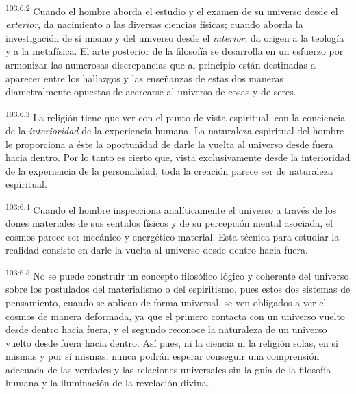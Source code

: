 \par
\textsuperscript{103:6.2} Cuando el hombre aborda el estudio y el examen de su universo desde el \textit{exterior}, da nacimiento a las diversas ciencias físicas; cuando aborda la investigación de sí mismo y del universo desde el \textit{interior}, da origen a la teología y a la metafísica. El arte posterior de la filosofía se desarrolla en un esfuerzo por armonizar las numerosas discrepancias que al principio están destinadas a aparecer entre los hallazgos y las enseñanzas de estas dos maneras diametralmente opuestas de acercarse al universo de cosas y de seres.

\par
\textsuperscript{103:6.3} La religión tiene que ver con el punto de vista espiritual, con la conciencia de la \textit{interioridad} de la experiencia humana. La naturaleza espiritual del hombre le proporciona a éste la oportunidad de darle la vuelta al universo desde fuera hacia dentro. Por lo tanto es cierto que, vista exclusivamente desde la interioridad de la experiencia de la personalidad, toda la creación parece ser de naturaleza espiritual.

\par
\textsuperscript{103:6.4} Cuando el hombre inspecciona analíticamente el universo a través de los dones materiales de sus sentidos físicos y de su percepción mental asociada, el cosmos parece ser mecánico y energético-material. Esta técnica para estudiar la realidad consiste en darle la vuelta al universo desde dentro hacia fuera.

\par
\textsuperscript{103:6.5} No se puede construir un concepto filosófico lógico y coherente del universo sobre los postulados del materialismo o del espiritismo, pues estos dos sistemas de pensamiento, cuando se aplican de forma universal, se ven obligados a ver el cosmos de manera deformada, ya que el primero contacta con un universo vuelto desde dentro hacia fuera, y el segundo reconoce la naturaleza de un universo vuelto desde fuera hacia dentro. Así pues, ni la ciencia ni la religión solas, en sí mismas y por sí mismas, nunca podrán esperar conseguir una comprensión adecuada de las verdades y las relaciones universales sin la guía de la filosofía humana y la iluminación de la revelación divina.

